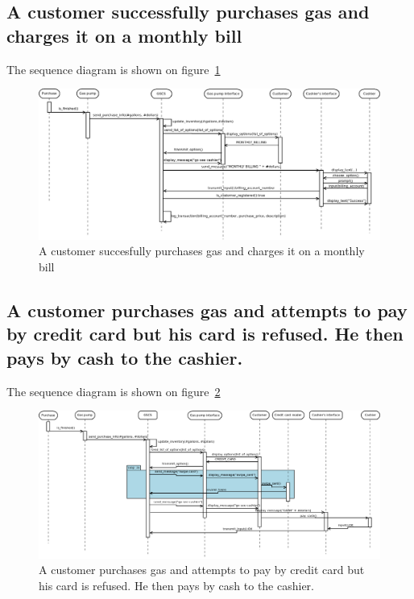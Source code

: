 \subsection{A customer successfully purchases gas and charges it on
a monthly bill}

The sequence diagram is shown on figure~\ref{fig:seq-diagram1}

\begin{landscape}
    \begin{figure}[!ht]
        \centering
        \includegraphics[width=\linewidth]{drafts/sequence_1.png}
        \caption{A customer succesfully purchases gas and charges it on a
        monthly bill}
        \label{fig:seq-diagram1}
    \end{figure}
\end{landscape}

\subsection{A customer purchases gas and attempts to pay by credit
card but his card is refused. He then pays by cash to the cashier.}

The sequence diagram is shown on figure~\ref{fig:seq-diagram2}

\begin{landscape}
    \begin{figure}[!ht]
        \centering
        \includegraphics[width=\linewidth]{drafts/sequence_2.png}
        \caption{A customer purchases gas and attempts to pay by credit card but
        his card is refused. He then pays by cash to the cashier.}
        \label{fig:seq-diagram2}
    \end{figure}
\end{landscape}

